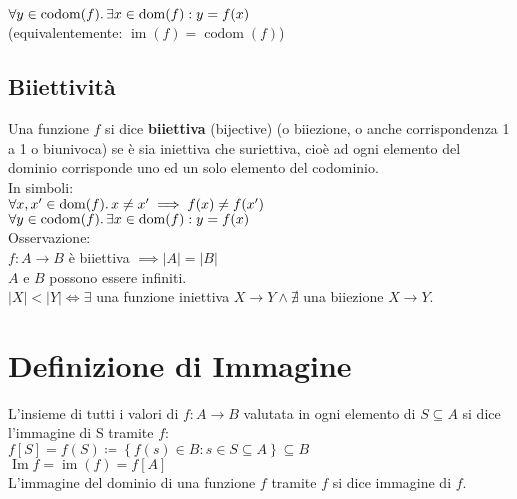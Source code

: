 \documentclass[a4paper, twoside, italian, 11pt]{book}
\newcommand{\braces}[1] {\left \{ #1 \right \}}
\newcommand{\card}[1] {\left | #1 \right |}
\DeclareMathOperator{\dom}{dom}
\DeclareMathOperator{\codom}{codom}
\DeclareMathOperator{\Ima}{Im}
\DeclareMathOperator{\im}{im}
\begin{document}
$\forall y \in \codom(f) \ldotp \exists x \in \dom(f) : y = f(x)$ \\

\noindent
(equivalentemente: $\im(f) = \codom(f)$)


\subsection{Biiettività}

Una funzione $f$ si dice \textbf{biiettiva} (bijective) (o biiezione, o anche corrispondenza 1 a 1 o biunivoca) se è sia iniettiva che suriettiva, cioè ad ogni elemento del dominio corrisponde uno ed un solo elemento del codominio. \\

\noindent
In simboli: \\

$\forall x, x' \in \dom(f) \ldotp x \neq x' \implies f(x) \neq f(x')$ \\
\indent
$\forall y \in \codom(f) \ldotp \exists x \in \dom(f) : y = f(x)$ \\


\noindent
Osservazione: \\

$f : A \rightarrow B$ è biiettiva $\implies \card A = \card B$ \\

\noindent
$A$ e $B$ possono essere infiniti. \\

\noindent
$\card X < \card Y \iff \exists$ una funzione iniettiva $X \rightarrow Y \land \nexists$ una biiezione $X \rightarrow Y$.



\section{Definizione di Immagine}

L'insieme di tutti i valori di $f : A \rightarrow B$ valutata in ogni elemento di $S \subseteq A$ si dice l'immagine di S tramite $f$: \\

$f[S] = f(S) \coloneqq \braces{f(s) \in B : s \in S \subseteq A} \subseteq B$ \\

$\Ima f = \im(f) = f[A]$ \\

\noindent
L'immagine del dominio di una funzione $f$ tramite $f$ si dice immagine di $f$.\\
\end{document}
